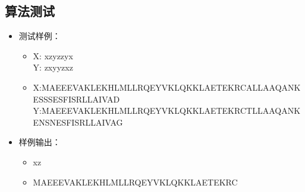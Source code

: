 \documentclass[a4paper]{article}
\begin{document}
\subsection{算法测试}
\begin{itemize}
\item
    测试样例：
    \begin{itemize}
    \item
        X: xzyzzyx\\
        Y: zxyyzxz
    \item
        X:MAEEEVAKLEKHLMLLRQEYVKLQKKLAETEKRCALLAAQANKESSSESFISRLLAIVAD\\
        Y:MAEEEVAKLEKHLMLLRQEYVKLQKKLAETEKRCTLLAAQANKENSNESFISRLLAIVAG
    \end{itemize}
\item
    样例输出：
    \begin{itemize}
    \item
        xz
    \item
        MAEEEVAKLEKHLMLLRQEYVKLQKKLAETEKRC
    \end{itemize}
\end{itemize}
\end{document}
